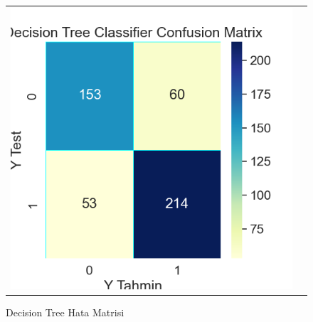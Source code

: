 \documentclass[conference]{IEEEtran}
\begin{document}
\begin{figure}[!h]
	\centering
	\begin{center}
		\begin{tabular}{cc}
			\includegraphics[scale=0.45]{pictures/pic_14.png}&
		\end{tabular}
	\end{center}
	\caption{Decision Tree Hata Matrisi}
	\label{fig:14}
\end{figure}
\end{document}
